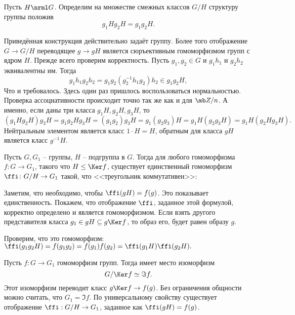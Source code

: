 \dfn[Факторгруппа] Пусть $H\nrml G$. Определим на множестве смежных классов $G/H$ структуру группы положив 
$$g_1 H g_2 H= g_1g_2 H.$$
\edfn

\utv Приведённая конструкция действительно задаёт группу. Более того отображение $G \to G/H$ переводящее $g \to gH$ является сюръективным гомоморфизмом групп с ядром $H$. 
\eutv 
\proof Прежде всего проверим корректность. Пусть $g_1,g_2\in G$ и $g_1h_1$ и $g_2h_2$ эквивалентны им. Тогда $$g_1h_1g_2h_2=g_1g_2(g_2^{-1}h_1 g_2) h_2 \in g_1g_2H,$$
Что и требовалось. Здесь один раз пришлось воспользоваться нормальностью. Проверка ассоциативности происходит точно так же как и для $\mb Z/n$. А именно, если даны три класса $g_1H, g_2H, g_3H$, то
$$(g_1H g_2H) g_3H=g_1g_2H g_3H=(g_1 g_2) g_3H=g_1 (g_2 g_3)H=g_1H (g_2 g_3H)=g_1H (g_2H g_3H).$$
Нейтральным элементом является класс $1\cdot H=H$, обратным для класса $gH$ является класс $g^{-1}H$.
\endproof

 Пусть $G,G_1$ -- группы, $H$ -- подгруппа в $G$. Тогда для любого гомоморфизма $f \colon G\to G_1$, такого что $ H \leq \Ker f$, существует единственный гомоморфизм $\ffi\colon G/H \to G_1$ такой, что <<треугольник коммутативен>>:
\begin{center}
\end{center}
\proof Заметим, что необходимо, чтобы $\ffi(gH)=f(g)$. Это показывает единственность. Покажем, что отображение $\ffi$, заданное этой формулой, корректно определено и является гомоморфизмом. Если взять другого представителя класса $g_1\in gH\subseteq g \Ker f $, то образ его, будет равен образу $g$.

Проверим, что это гомоморфизм: $\ffi(g_1g_2H)=f(g_1g_2)=f(g_1)f(g_2)=\ffi(g_1H)\ffi(g_2H).$
\endproof
\ethrm

\thrm Пусть $f\colon G \to G_1$ гомоморфизм групп. Тогда имеет место изоморфизм 
$$G/\Ker f \simeq \Im f.$$
Этот изоморфизм переводит класс $g \Ker f \to f(g)$. 
\ethrm
\proof Без ограничения общности можно считать, что $G_1=\Im f$. По универсальному свойству существует отображение $\ffi : G/H \to G_1$, заданное как $\ffi(gH)=f(g)$.

